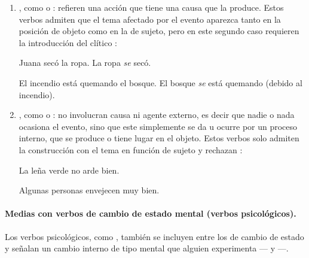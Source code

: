 \begin{recuadro}
\begin{enumerate}[label=\alph*)]
  \item {}, como  o
        : refieren una acción que tiene una causa que la produce.
        Estos verbos admiten que el tema afectado por el evento aparezca tanto en
        la posición de objeto como en la de sujeto, pero en este segundo caso
        requieren la introducción del clítico :
        \begin{exe}
          \ex
            \begin{xlist}
              \ex Juana secó la ropa.
              \ex La ropa \textit{se} secó.
            \end{xlist}
          \ex
            \begin{xlist}
              \ex El incendio está quemando el bosque.
              \ex El bosque \textit{se} está quemando (debido al incendio).
            \end{xlist}
        \end{exe}
  \item {}, como  o
        : no involucran causa ni agente externo, es decir que
        nadie o nada ocasiona el evento, sino que este simplemente se da u ocurre
        por un proceso interno, que se produce o tiene lugar en el objeto. Estos
        verbos solo admiten la construcción con el tema en función de sujeto y
        rechazan :
        \begin{exe}
          \ex
            \begin{xlist}
              \ex La leña verde no arde bien.
            \end{xlist}
          \ex
            \begin{xlist}
              \ex Algunas personas envejecen muy bien.
            \end{xlist}
        \end{exe}
\end{enumerate}
\end{recuadro}

\paragraph{Medias con verbos de cambio de estado mental (verbos psicológicos).}
Los verbos psicológicos, como , también se incluyen entre los de cambio de estado y señalan un
cambio interno de tipo mental que alguien experimenta ---
 y  ---.

